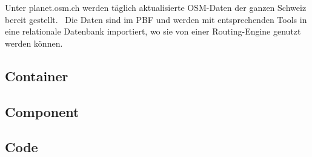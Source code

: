 Unter planet.osm.ch werden täglich aktualisierte \ac{OSM}-Daten der ganzen Schweiz bereit gestellt.~\cite{planet_osm_ch}
Die Daten sind im \ac{PBF} und werden mit entsprechenden Tools in eine relationale Datenbank importiert, wo sie von einer Routing-Engine genutzt werden können.


\subsection{Container}
\label{Architektur:Container}



\subsection{Component}
\label{Architektur:Component}


\subsection{Code}
\label{Architektur:Code}

